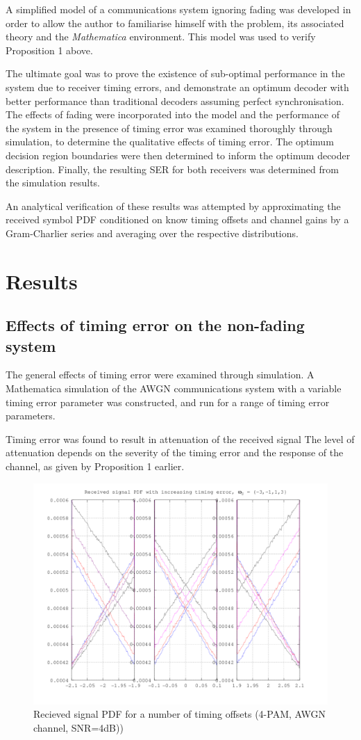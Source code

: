 A simplified model of a communications system ignoring fading was developed in order to allow the author to familiarise himself with the problem, its associated theory and the \emph{Mathematica} environment. This model was used to verify Proposition 1 above.

The ultimate goal was to prove the existence of sub-optimal performance in the system due to receiver timing errors, and demonstrate an optimum decoder with better performance than traditional decoders assuming perfect synchronisation. The effects of fading were incorporated into the model and the performance of the system in the presence of timing error was examined thoroughly through simulation, to determine the qualitative effects of timing error. The optimum decision region boundaries were then determined to inform the optimum decoder description. Finally, the resulting SER for both receivers was determined from the simulation results.

An analytical verification of these results was attempted by approximating the received symbol PDF conditioned on know timing offsets and channel gains by a Gram-Charlier series and averaging over the respective distributions.

\chapter{Results}

\section{Effects of timing error on the non-fading system}

The general effects of timing error were examined through simulation. A Mathematica simulation of the AWGN communications system with a variable timing error parameter was constructed, and run for a range of timing error parameters.

Timing error was found to result in attenuation of the received signal The level of attenuation depends on the severity of the timing error and the response of the channel, as given by Proposition 1 earlier.

\begin{figure}[htbp]
\centering
\includegraphics[width=0.8\linewidth]{../../../plots/4pamdecisionerror.png}
\caption[Non-fading received symbol PDF]{Recieved signal PDF for a number of timing offsets (4-PAM, AWGN channel, SNR=4dB))}
\end{figure}

